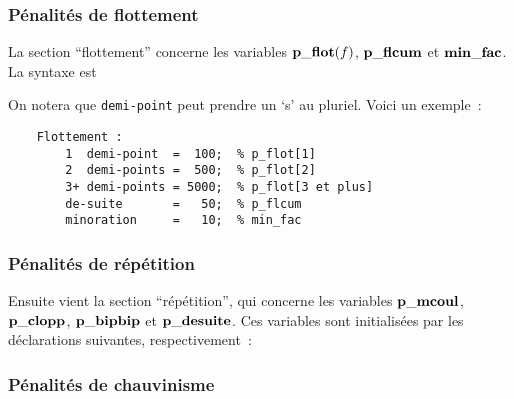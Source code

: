 \documentclass[10pt]{article}
\begin{document}
\subsubsection{P\'enalit\'es de flottement}

La section ``flottement'' concerne les variables ${\bf p\_flot}(f)$,
$\bf p\_flcum$ et $\bf min\_fac$. La syntaxe est

\medbreak
{}
\medbreak

\noindent On notera que \verb|demi-point| peut prendre un `s' au pluriel.
Voici un exemple~:
\begin{verbatim}
    Flottement :
        1  demi-point  =  100;  % p_flot[1]
        2  demi-points =  500;  % p_flot[2]
        3+ demi-points = 5000;  % p_flot[3 et plus]
        de-suite       =   50;  % p_flcum
        minoration     =   10;  % min_fac
\end{verbatim}

\subsubsection{P\'enalit\'es de r\'ep\'etition}

Ensuite vient la section ``r\'ep\'etition'', qui concerne les variables
$\bf p\_mcoul$, $\bf p\_clopp$, $\bf p\_bipbip$ et $\bf p\_desuite$. Ces
variables sont initialis\'ees par les d\'eclara\-tions suivantes,
respectivement~:

\medbreak
{}
\medbreak

\subsubsection{P\'enalit\'es de chauvinisme}
\end{document}

